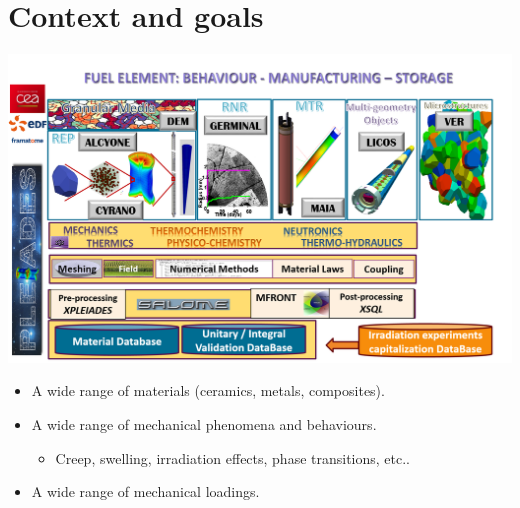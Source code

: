 \documentclass{beamer}
\begin{document}
\PageTitre{}

\begin{frame}[fragile]
  \begin{flushleft}
    {\tiny
      \tableofcontents[hideallsubsections]
    }
  \end{flushleft}
\end{frame}

\section{Context and goals}

\begin{frame}[fragile]
  \begin{center}
    \includegraphics[width=0.70\linewidth]{img/PLEIADES_2019_en.png}
  \end{center}
  \begin{itemize}
    \item A wide range of materials (ceramics, metals, composites).
    \item A wide range of mechanical phenomena and behaviours.
    \begin{itemize}
      \item Creep, swelling, irradiation effects, phase transitions, etc..
    \end{itemize}
    \item A wide range of mechanical loadings.
  \end{itemize}
\end{frame}
\end{document}
